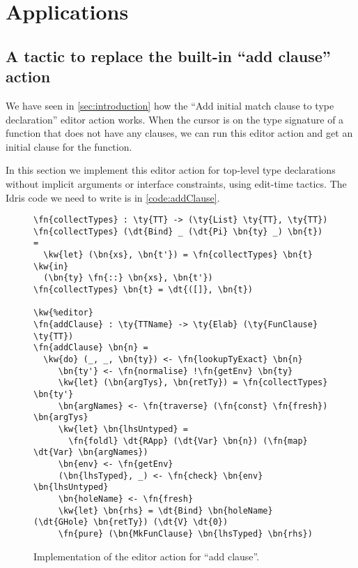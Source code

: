 \section{Applications} \label{sec:applications}

\subsection{A tactic to replace the built-in ``add clause'' action}\label{sec:addClause}

We have seen in \autoref{sec:introduction} how the ``Add initial match clause
to type declaration'' editor action works. When the cursor is on the type
signature of a function that does not have any clauses, we can run this editor
action and get an initial clause for the function.

In this section we implement this editor action for top-level type declarations
without implicit arguments or interface constraints, using edit-time tactics.
The Idris code we need to write is in \autoref{code:addClause}.

\begin{figure}[ht]
\begin{Verbatim}[framesep=2mm, label=\footnotesize{\normalfont{Idris}}, labelposition=topline]
\fn{collectTypes} : \ty{TT} -> (\ty{List} \ty{TT}, \ty{TT})
\fn{collectTypes} (\dt{Bind} _ (\dt{Pi} \bn{ty} _) \bn{t}) =
  \kw{let} (\bn{xs}, \bn{t'}) = \fn{collectTypes} \bn{t} \kw{in}
  (\bn{ty} \fn{::} \bn{xs}, \bn{t'})
\fn{collectTypes} \bn{t} = \dt{([]}, \bn{t})

\kw{%editor}
\fn{addClause} : \ty{TTName} -> \ty{Elab} (\ty{FunClause} \ty{TT})
\fn{addClause} \bn{n} =
  \kw{do} (_, _, \bn{ty}) <- \fn{lookupTyExact} \bn{n}
     \bn{ty'} <- \fn{normalise} !\fn{getEnv} \bn{ty}
     \kw{let} (\bn{argTys}, \bn{retTy}) = \fn{collectTypes} \bn{ty'}
     \bn{argNames} <- \fn{traverse} (\fn{const} \fn{fresh}) \bn{argTys}
     \kw{let} \bn{lhsUntyped} =
       \fn{foldl} \dt{RApp} (\dt{Var} \bn{n}) (\fn{map} \dt{Var} \bn{argNames})
     \bn{env} <- \fn{getEnv}
     (\bn{lhsTyped}, _) <- \fn{check} \bn{env} \bn{lhsUntyped}
     \bn{holeName} <- \fn{fresh}
     \kw{let} \bn{rhs} = \dt{Bind} \bn{holeName} (\dt{GHole} \bn{retTy}) (\dt{V} \dt{0})
     \fn{pure} (\bn{MkFunClause} \bn{lhsTyped} \bn{rhs})
\end{Verbatim}
\caption{Implementation of the editor action for ``add clause''.}
\label{code:addClause}
\end{figure}

